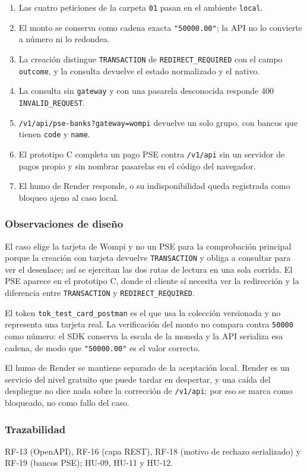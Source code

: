 \begin{enumerate}
  \item Las cuatro peticiones de la carpeta \texttt{01} pasan en el ambiente \texttt{local}.
  \item El monto se conserva como cadena exacta \texttt{"50000.00"}; la API no lo convierte a número ni lo redondea.
  \item La creación distingue \texttt{TRANSACTION} de \texttt{REDIRECT\_REQUIRED} con el campo \texttt{outcome}, y la consulta devuelve el estado normalizado y el nativo.
  \item La consulta sin \texttt{gateway} y con una pasarela desconocida responde 400 \texttt{INVALID\_REQUEST}.
  \item \texttt{/v1/api/pse-banks?gateway=wompi} devuelve un solo grupo, con bancos que tienen \texttt{code} y \texttt{name}.
  \item El prototipo C completa un pago PSE contra \texttt{/v1/api} sin un servidor de pagos propio y sin nombrar pasarelas en el código del navegador.
  \item El humo de Render responde, o su indisponibilidad queda registrada como bloqueo ajeno al caso local.
\end{enumerate}

\subsubsection{Observaciones de diseño}

El caso elige la tarjeta de Wompi y no un PSE para la comprobación principal porque la creación con tarjeta devuelve \texttt{TRANSACTION} y obliga a consultar para ver el desenlace; así se ejercitan las dos rutas de lectura en una sola corrida. El PSE aparece en el prototipo C, donde el cliente sí necesita ver la redirección y la diferencia entre \texttt{TRANSACTION} y \texttt{REDIRECT\_REQUIRED}.

El token \texttt{tok\_test\_card\_postman} es el que usa la colección versionada y no representa una tarjeta real. La verificación del monto no compara contra \texttt{50000} como número: el SDK conserva la escala de la moneda y la API serializa esa cadena, de modo que \texttt{"50000.00"} es el valor correcto.

El humo de Render se mantiene separado de la aceptación local. Render es un servicio del nivel gratuito que puede tardar en despertar, y una caída del despliegue no dice nada sobre la corrección de \texttt{/v1/api}; por eso se marca como bloqueado, no como fallo del caso.

\subsubsection{Trazabilidad}

RF-13 (OpenAPI), RF-16 (capa REST), RF-18 (motivo de rechazo serializado) y RF-19 (bancos PSE); HU-09, HU-11 y HU-12.
